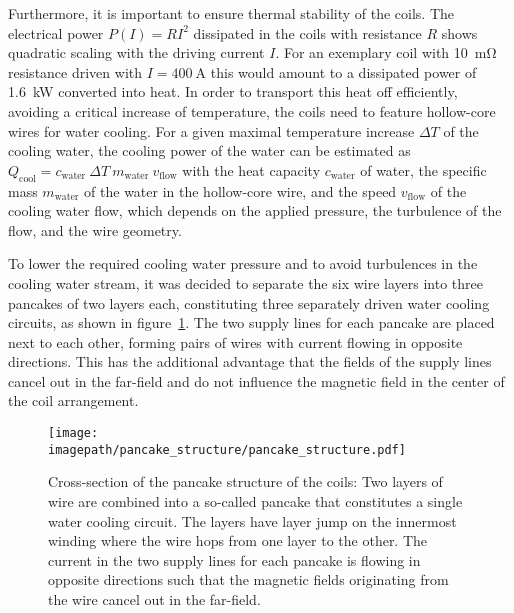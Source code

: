 Furthermore, it is important to ensure thermal stability of the coils. The electrical power $P(I) = RI^2$ dissipated in the coils with resistance $R$ shows quadratic scaling  with the driving current $I$. For an exemplary coil with \SI{10}{\milli\ohm} resistance driven with $I = \SI{400}{\ampere}$ this would amount to a dissipated power of \SI{1.6}{\kilo\watt} converted into heat. In order to transport this heat off efficiently, avoiding a critical increase of temperature, the coils need to feature hollow-core wires for water cooling. For a given maximal temperature increase $\Delta T$ of the cooling water, the cooling power of the water can be estimated as $Q_\text{cool} = c_\text{water} ~ \Delta T ~ m_\text{water} ~ v_\text{flow}$ with the heat capacity $ c_\text{water}$ of water, the specific mass $m_\text{water}$ of the water in the hollow-core wire, and the speed $v_\text{flow}$ of the cooling water flow, which depends on the applied pressure, the turbulence of the flow, and the wire geometry.

To lower the required cooling water pressure and to avoid turbulences in the cooling water stream, it was decided to separate the six wire layers into three pancakes of two layers each, constituting three separately driven water cooling circuits, as shown in figure~\ref{fig:pancake_structure}. The two supply lines for each pancake are placed next to each other, forming pairs of wires with current flowing in opposite directions. This has the additional advantage that the fields of the supply lines cancel out in the far-field and do not influence the magnetic field in the center of the coil arrangement.

\begin{figure}
    \centering
    \texttt{[image: \\imagepath/pancake\_structure/pancake\_structure.pdf]}
    \caption{Cross-section of the pancake structure of the coils: Two layers of wire are combined into a so-called pancake that constitutes a single water cooling circuit. The layers have layer jump on the innermost winding where the wire hops from one layer to the other. The current in the two supply lines for each pancake is flowing in opposite directions such that the magnetic fields originating from the wire cancel out in the far-field.}
    \label{fig:pancake_structure}
\end{figure}

